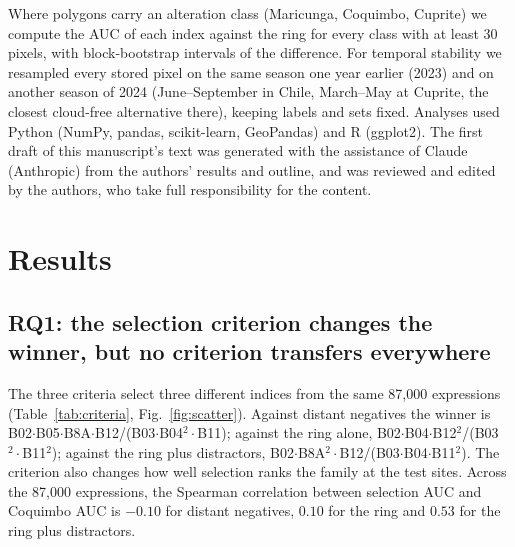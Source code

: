 \documentclass[pdflatex,sn-basic]{sn-jnl}
\begin{document}
Where polygons carry an alteration class (Maricunga, Coquimbo, Cuprite) we compute the AUC of each index against the ring for every class with at least 30 pixels, with block-bootstrap intervals of the difference. For temporal stability we resampled every stored pixel on the same season one year earlier (2023) and on another season of 2024 (June--September in Chile, March--May at Cuprite, the closest cloud-free alternative there), keeping labels and sets fixed. Analyses used Python (NumPy, pandas, scikit-learn, GeoPandas) and R (ggplot2). The first draft of this manuscript's text was generated with the assistance of Claude (Anthropic) from the authors' results and outline, and was reviewed and edited by the authors, who take full responsibility for the content.

\section{Results}
\label{sec:results}

\subsection{RQ1: the selection criterion changes the winner, but no criterion transfers everywhere}
\label{sec:rq1}

The three criteria select three different indices from the same 87{,}000 expressions (Table~\ref{tab:criteria}, Fig.~\ref{fig:scatter}). Against distant negatives the winner is B02$\cdot$B05$\cdot$B8A$\cdot$B12/(B03$\cdot$B04$^2\cdot$B11); against the ring alone, B02$\cdot$B04$\cdot$B12$^2$/(B03$^2\cdot$B11$^2$); against the ring plus distractors, B02$\cdot$B8A$^2\cdot$B12/(B03$\cdot$B04$\cdot$B11$^2$). The criterion also changes how well selection ranks the family at the test sites. Across the 87{,}000 expressions, the Spearman correlation between selection AUC and Coquimbo AUC is $-0.10$ for distant negatives, $0.10$ for the ring and $0.53$ for the ring plus distractors.
\end{document}

